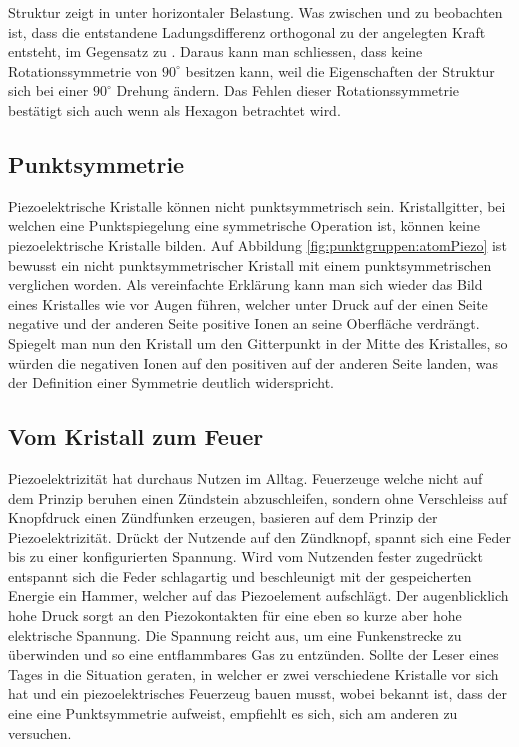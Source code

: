 Struktur  zeigt  in unter horizontaler Belastung.
Was zwischen  und  zu beobachten ist, dass die entstandene Ladungsdifferenz orthogonal zu der angelegten Kraft entsteht, im Gegensatz zu .
Daraus kann man schliessen, dass  keine Rotationssymmetrie von \(90^\circ\) besitzen kann, weil die Eigenschaften der Struktur sich bei einer \(90^\circ\) Drehung ändern.
Das Fehlen dieser Rotationssymmetrie bestätigt sich auch wenn  als Hexagon betrachtet wird.
 

\subsection{Punktsymmetrie}

Piezoelektrische Kristalle können nicht punktsymmetrisch sein.
Kristallgitter, bei welchen eine Punktspiegelung eine symmetrische Operation ist, können keine piezoelektrische Kristalle bilden.
Auf Abbildung \ref{fig:punktgruppen:atomPiezo} ist bewusst  ein nicht punktsymmetrischer Kristall mit einem punktsymmetrischen  verglichen worden.
Als vereinfachte Erklärung kann man sich wieder das Bild eines Kristalles wie  vor Augen führen, welcher unter Druck auf der einen Seite negative und der anderen Seite positive Ionen an seine Oberfläche verdrängt.
Spiegelt man nun den Kristall um den Gitterpunkt in der Mitte des Kristalles, so würden die negativen Ionen auf den positiven auf der anderen Seite landen, was der Definition einer Symmetrie deutlich widerspricht.


\subsection{Vom Kristall zum Feuer}

Piezoelektrizität hat durchaus Nutzen im Alltag.
Feuerzeuge welche nicht auf dem Prinzip beruhen einen Zündstein abzuschleifen, sondern ohne Verschleiss auf Knopfdruck einen Zündfunken erzeugen, basieren auf dem Prinzip der Piezoelektrizität.
Drückt der Nutzende auf den Zündknopf, spannt sich eine Feder bis zu einer konfigurierten Spannung.
Wird vom Nutzenden fester zugedrückt entspannt sich die Feder schlagartig und beschleunigt mit der gespeicherten Energie ein Hammer, welcher auf das Piezoelement aufschlägt.
Der augenblicklich hohe Druck sorgt an den Piezokontakten für eine eben so kurze aber hohe elektrische Spannung.
Die Spannung reicht aus, um eine Funkenstrecke zu überwinden und so eine entflammbares Gas zu entzünden.
Sollte der Leser eines Tages in die Situation geraten, in welcher er zwei verschiedene Kristalle vor sich hat und ein piezoelektrisches Feuerzeug bauen musst, wobei bekannt ist, dass der eine eine Punktsymmetrie aufweist, empfiehlt es sich, sich am anderen zu versuchen.

